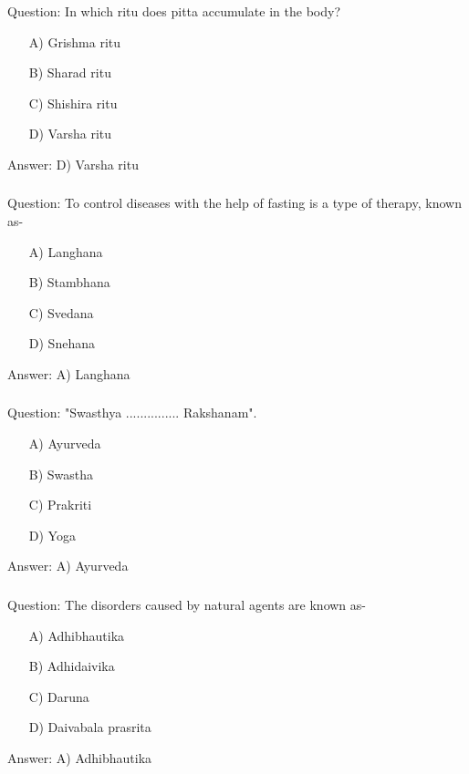 \begin{frame}[fragile]\frametitle{}

Question: In which ritu does pitta accumulate in the body?

\begin{itemize}
\item[A)] Grishma ritu
\item[B)] Sharad ritu
\item[C)] Shishira ritu
\item[D)] Varsha ritu
\end{itemize}

Answer: D) Varsha ritu
\end{frame}

\begin{frame}[fragile]\frametitle{}

Question: To control diseases with the help of fasting is a type of therapy, known as-

\begin{itemize}
\item[A)] Langhana
\item[B)] Stambhana
\item[C)] Svedana
\item[D)] Snehana
\end{itemize}

Answer: A) Langhana
\end{frame}

\begin{frame}[fragile]\frametitle{}

Question: "Swasthya ............... Rakshanam".

\begin{itemize}
\item[A)] Ayurveda
\item[B)] Swastha
\item[C)] Prakriti
\item[D)] Yoga
\end{itemize}

Answer: A) Ayurveda
\end{frame}

\begin{frame}[fragile]\frametitle{}

Question: The disorders caused by natural agents are known as-

\begin{itemize}
\item[A)] Adhibhautika
\item[B)] Adhidaivika
\item[C)] Daruna
\item[D)] Daivabala prasrita
\end{itemize}

Answer: A) Adhibhautika
\end{frame}

